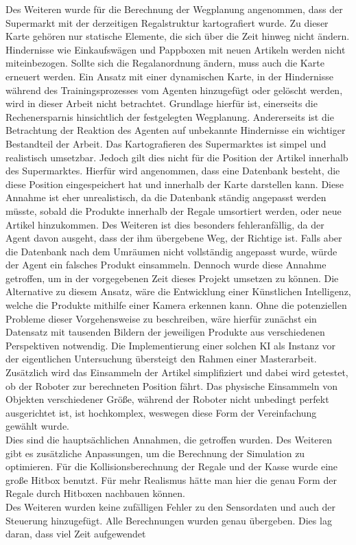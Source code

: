 Des Weiteren wurde für die Berechnung der Wegplanung angenommen, dass der Supermarkt mit der derzeitigen Regalstruktur kartografiert wurde. Zu dieser Karte gehören nur statische Elemente, die sich über die Zeit hinweg nicht ändern. Hindernisse wie Einkaufswägen und Pappboxen mit neuen Artikeln werden nicht miteinbezogen. Sollte sich die Regalanordnung ändern, muss auch die Karte erneuert werden. Ein Ansatz mit einer dynamischen Karte, in der Hindernisse während des Trainingsprozesses vom Agenten hinzugefügt oder gelöscht werden, wird in dieser Arbeit nicht betrachtet. Grundlage hierfür ist, einerseits die Rechenersparnis hinsichtlich der festgelegten Wegplanung. Andererseits ist die Betrachtung der Reaktion des Agenten auf unbekannte Hindernisse ein wichtiger Bestandteil der Arbeit. Das Kartografieren des Supermarktes ist simpel und realistisch umsetzbar. Jedoch gilt dies nicht für die Position der Artikel innerhalb des Supermarktes. Hierfür wird angenommen, dass eine Datenbank besteht, die diese Position eingespeichert hat und innerhalb der Karte darstellen kann. Diese Annahme ist eher unrealistisch, da die Datenbank ständig angepasst werden müsste, sobald die Produkte innerhalb der Regale umsortiert werden, oder neue Artikel hinzukommen. Des Weiteren ist dies besonders fehleranfällig, da der Agent davon ausgeht, dass der ihm übergebene Weg, der Richtige ist. Falls aber die Datenbank nach dem Umräumen nicht vollständig angepasst wurde, würde der Agent ein falsches Produkt einsammeln. Dennoch wurde diese Annahme getroffen, um in der vorgegebenen Zeit dieses Projekt umsetzen zu können. Die Alternative zu diesem Ansatz, wäre die Entwicklung einer Künstlichen Intelligenz, welche die Produkte mithilfe einer Kamera erkennen kann. Ohne die potenziellen Probleme dieser Vorgehensweise zu beschreiben, wäre hierfür zunächst ein Datensatz mit tausenden Bildern der jeweiligen Produkte aus verschiedenen Perspektiven notwendig. Die Implementierung einer solchen KI als Instanz vor der eigentlichen Untersuchung übersteigt den Rahmen einer Masterarbeit. 
\\
Zusätzlich wird das Einsammeln der Artikel simplifiziert und dabei wird getestet, ob der Roboter zur berechneten Position fährt. Das physische Einsammeln von Objekten verschiedener Größe, während der Roboter nicht unbedingt perfekt ausgerichtet ist, ist hochkomplex, weswegen diese Form der Vereinfachung gewählt wurde.
\\
Dies sind die hauptsächlichen Annahmen, die getroffen wurden. Des Weiteren gibt es zusätzliche Anpassungen, um die Berechnung der Simulation zu optimieren. Für die Kollisionsberechnung der Regale und der Kasse wurde eine große Hitbox benutzt. Für mehr Realismus hätte man hier die genau Form der Regale durch Hitboxen nachbauen können. 
\\
Des Weiteren wurden keine zufälligen Fehler zu den Sensordaten und auch der Steuerung hinzugefügt. Alle Berechnungen wurden genau übergeben. Dies lag daran, dass viel Zeit aufgewendet
